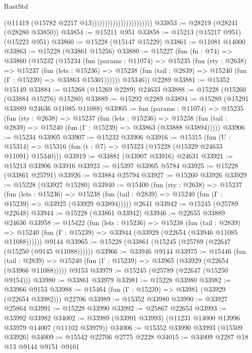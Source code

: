 \begin{lexlean}{RustStd}
\begin{coremodule}
                                              (@11419 (@15782 @2217 @13)))))))))))))))))))))))
@33853 := @28219 (@28241 (@28280 @33850))
@33854 := @15211 @951
@33858 := @15213 (@15217 @951) (@15223 @951)
@33860 := @15228 (@15147 @15229)
@33861 := @11081 @14000
@33863 := @15228 (@33861 @15256)
@33880 := @15227
    (fun (fn : @74) =>
    @33860
      (@15232
        (@15234
          (fun (params : @11074) =>
          @15235
            (fun (rty : @2638) =>
            @15237
              (fun (lets : @15236) =>
              @15238 (fun (tail : @2839) => @15240 (fun (Γ : @15239) => @33863 @15301))))))
        @15346))
    @2289
@33881 := @15352 @15149
@33884 := @15268 (@15269 @2289) @24633
@33888 := @15228 (@15260 (@33884 @15276) @15280)
@33889 := @15292 @2289
@33894 := @15289 (@15291 @33889 @24636 @11085 @11088)
@33905 := fun (params : @11074) =>
  @15235
    (fun (rty : @2638) =>
    @15237
      (fun (lets : @15236) =>
      @15238 (fun (tail : @2839) => @15240 (fun (Γ : @15239) => @33863 (@33888 @33894)))))
@33906 := @15234 @33905
@33907 := @15232 @33906
@33916 := @15315
    (fun (U : @15314) => @15316 (fun (t : @7) => @15323 (@15228 (@15329 @24633 @11091) @15340)))
@33919 := @33881 (@33907 @33916) @24631
@33921 := @15213 @33906 @33916
@33923 := @15397 @33905 @5784
@33925 := @15228 (@33861 @25791)
@33926 := @33884 @25794
@33927 := @15260 @33926
@33929 := @15228 (@33927 @15280)
@33940 := @15400
    (fun (rty : @2638) =>
    @15237
      (fun (lets : @15236) =>
      @15238 (fun (tail : @2839) => @15240 (fun (Γ : @15239) => @33925 (@33929 @33894)))))
    @2641
@33942 := @15245 (@25789 @22648)
@33944 := @15228 (@33861 @33942)
@33946 := @22655 @33889 @24636
@33958 := @15422
    (fun (lets : @15236) =>
    @15238
      (fun (tail : @2839) =>
      @15240 (fun (Γ : @15239) => @33944 (@33929 (@22654 (@33946 @11085 @11088))))))
    @9144
@33965 := @15228 (@33861 (@15245 (@25789 (@22647 (@15250 (@9145 @11088))))))
@33966 := @33946 @9144
@33975 := @15446
    (fun (tail : @2839) => @15240 (fun (Γ : @15239) => @33965 (@33929 (@22654 (@33966 @11088)))))
    @9153
@33979 := @15245 (@25789 (@22647 (@15250 @9154)))
@33980 := @33861 @33979
@33981 := @15228 @33980
@33982 := @33966 @9153
@33988 := @15464 (fun (Γ : @15239) => @33981 (@33929 (@22654 @33982))) @22706
@33989 := @15352 @33980
@33990 := @33927 @25864
@33991 := @15228 @33990
@33992 := @25867 @22653
@33993 := @33992 @33982
@34002 := @33989 (@33991 @33993) (@11231 @14000 @13996 @33979 @14007 (@11102 @33979))
@34006 := @15352 @33990 @33993 (@15509 @33926)
@34009 := @15542 @22706 @2775 @2228
@34015 := @34009 @2287 @18 @13 @9144 @9151 @9101

\end{coremodule}
\end{lexlean}
